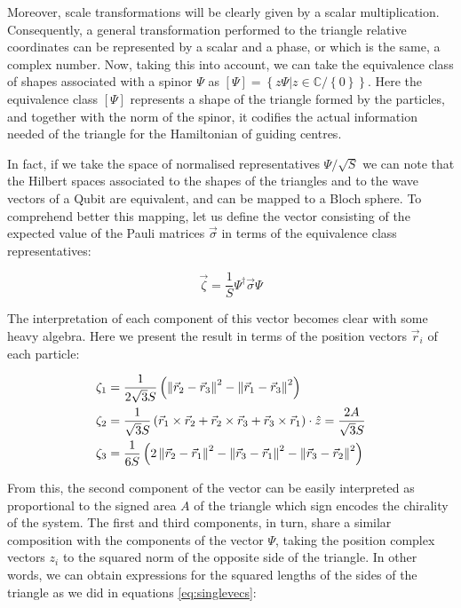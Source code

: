 Moreover, scale transformations will be clearly given by a scalar multiplication. Consequently, a general transformation performed to the triangle relative coordinates can be represented by a scalar and a phase, or which is the same, a complex number. Now, taking this into account, we can take the equivalence class of shapes associated with a spinor $\Psi$ as $\left[ \Psi \right] = \left\{ z\Psi | z \in \mathbb{C} / \left\{ 0 \right\} \right\}$. Here the equivalence class $\left[ \Psi \right]$ represents a shape of the triangle formed by the particles, and together with the norm of the spinor, it codifies the actual information needed of the triangle for the Hamiltonian of guiding centres. 

In fact, if we take the space of normalised representatives $\Psi/\sqrt{S}$ we can note that the Hilbert spaces associated to the shapes of the triangles and to the wave vectors of a Qubit are equivalent, and can be mapped to a Bloch sphere. To comprehend better this mapping, let us define the vector consisting of the expected value of the Pauli matrices $\vec{\sigma}$ in terms of the equivalence class representatives:

\begin{equation}
\vec{\zeta} = \frac{1}{S} \Psi^{\dagger}\vec{\sigma}\Psi
\end{equation}

The interpretation of each component of this vector becomes clear with some heavy algebra. Here we present the result in terms of the position vectors $ \vec{r}_i $ of each particle:

\begin{align*}
\zeta_1 &= \frac{1}{2\sqrt{3}S}\left( \left\lVert \vec{r}_2 -\vec{r}_3 \right\rVert^2-\left\lVert \vec{r}_1 -\vec{r}_3 \right\rVert^2 \right)\\
\zeta_2 &= \frac{1}{\sqrt{3}S}\left( \vec{r}_1\times\vec{r}_2 + \vec{r}_2\times\vec{r}_3 +\vec{r}_3\times\vec{r}_1 \right)\cdot\hat{z} = \frac{2A}{\sqrt{3}S} \\
\zeta_3 &= \frac{1}{6S}\left( 2\left\lVert \vec{r}_2 -\vec{r}_1 \right\rVert^2-\left\lVert \vec{r}_3 -\vec{r}_1 \right\rVert^2-\left\lVert \vec{r}_3 -\vec{r}_2 \right\rVert^2 \right)\\
\end{align*}

From this, the second component of the vector can be easily interpreted as proportional to the signed area $A$ of the triangle which sign encodes the chirality of the system. The first and third components, in turn, share a similar composition with the components of the vector $\Psi$, taking the position complex vectors $z_i$ to the squared norm of the opposite side of the triangle. In other words, we can obtain expressions for the squared lengths of the sides of the triangle as we did in equations \eqref{eq:singlevecs}:

